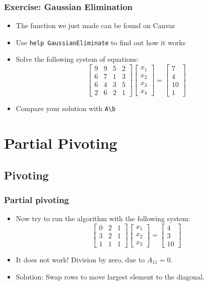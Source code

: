 \begin{frame}[fragile]
  \frametitle{Exercise: Gaussian Elimination}
  \begin{itemize}
    \item The function we just made can be found on Canvas
    \item Use \lstinline$help GaussianEliminate$ to find out how it works
    \item Solve the following system of equations:
    \[
    \begin{bmatrix}
      9 & 9 & 5 & 2\\ 
      6 & 7 & 1 & 3\\ 
      6 & 4 & 3 & 5\\
      2 & 6 & 2 & 1
    \end{bmatrix}
    \begin{bmatrix}x_1\\x_2\\x_3\\x_4\end{bmatrix} = 
    \begin{bmatrix}7\\4\\10\\1\end{bmatrix}
  \]
  \item Compare your solution with \lstinline$A\b$
  \end{itemize}
\end{frame}

\section{Partial Pivoting}
\subsection*{Pivoting}

\begin{frame}[fragile]
  \frametitle{Partial pivoting}
  \begin{itemize}
    \item Now try to run the algorithm with the following system:
    \[
    \begin{bmatrix}
      0 & 2 & 1\\ 
      3 & 2 & 1 \\ 
      1 & 1 & 1
    \end{bmatrix}
    \begin{bmatrix}x_1\\x_2\\x_3\end{bmatrix} = 
    \begin{bmatrix}4\\3\\10\end{bmatrix}
  \]
  \pause
  \item It does not work! Division by zero, due to $A_{11}=0$.
  \item Solution: Swap rows to move largest element to the diagonal.
  \end{itemize}
\end{frame}

